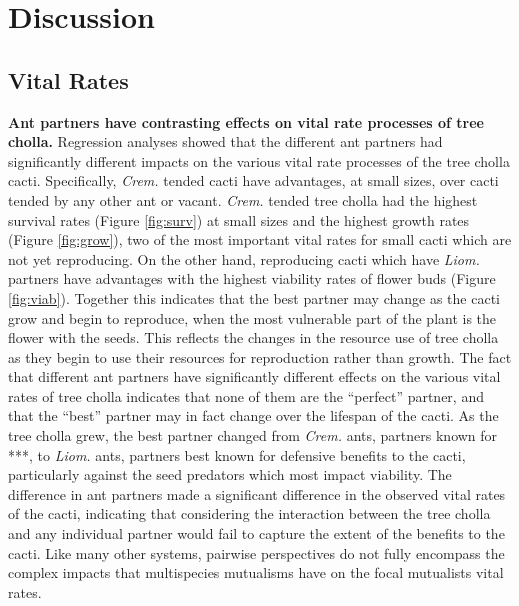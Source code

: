 \documentclass[12pt,a4paper]{article}
\begin{document}
{{\section*{Discussion}
\subsection*{Vital Rates}
\textbf{Ant partners have contrasting effects on vital rate processes of tree cholla.}
Regression analyses showed that the different ant partners had significantly different impacts on the various vital rate processes of the tree cholla cacti. 
Specifically, \textit{Crem.} tended cacti have advantages, at small sizes, over cacti tended by any other ant or vacant. 
\textit{Crem.} tended tree cholla had the highest survival rates (Figure \ref{fig:surv})  at small sizes and the highest growth rates (Figure \ref{fig:grow}), two of the most important vital rates for small cacti which are not yet reproducing. 
On the other hand, reproducing cacti which have \textit{Liom.} partners  have advantages with the highest viability rates of flower buds (Figure \ref{fig:viab}). 
Together this indicates that the best partner may change as the cacti grow and begin to reproduce, when the most vulnerable part of the plant is the flower with the seeds. 
This reflects the changes in the resource use of tree cholla as they begin to use their resources for reproduction rather than growth. 
The fact that different ant partners have significantly different effects on the various vital rates of tree cholla indicates that none of them are the “perfect” partner, and that the “best” partner may in fact change over the lifespan of the cacti. 
As the tree cholla grew, the best partner changed from \textit{Crem.} ants, partners known for ***, to \textit{Liom.} ants, partners best known for defensive benefits to the cacti, particularly against the seed predators which most impact viability. 
The difference in ant partners made a significant difference in the observed vital rates of the cacti, indicating that considering the interaction between the tree cholla and any individual partner would fail to capture the extent of the benefits to the cacti.
Like many other systems, pairwise perspectives do not fully encompass the complex impacts that multispecies mutualisms have on the focal mutualists vital rates.

}}
\end{document}
